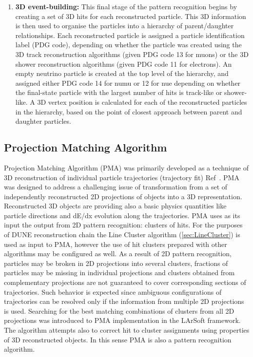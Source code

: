 \begin{enumerate}
\item{\bf 3D event-building:} This final stage of the pattern recognition begins by creating a set of 3D hits for each reconstructed particle. This 3D information is then used to organise the particles into a hierarchy of parent/daughter relationships. Each reconstructed particle is assigned a particle identification label (PDG code), depending on whether the particle was created using the 3D track reconstruction algorithms (given PDG code 13 for muons) or the 3D shower reconstruction algorithms (given PDG code 11 for electrons). An empty neutrino particle is created at the top level of the hierarchy, and assigned either PDG code 14 for numu or 12 for nue depending on whether the final-state particle with the largest number of hits is track-like or shower-like. A 3D vertex position is calculated for each of the reconstructed particles in the hierarchy, based on the point of closest approach between parent and daughter particles.
\end{enumerate}

\subsection{Projection Matching Algorithm}\label{sec:PMA}
Projection Matching Algorithm (PMA) was primarily developed as a technique of 3D reconstruction of individual particle trajectories (trajectory fit) Ref~\cite{Antonello:2012hu}. PMA was designed to address a challenging issue of transformation from a set of independently reconstructed 2D projections of objects into a 3D representation. Reconstructed 3D objects are providing also a basic physics quantities like particle directions and dE/dx evolution along the trajectories. PMA uses as its input the output from 2D pattern recognition: clusters of hits. For the purposes of DUNE reconstruction chain the Line Cluster algorithm (\ref{sec:LineCluster}) is used as input to PMA, however the use of hit clusters prepared with other algorithms may be configured as well. As a result of 2D pattern recognition, particles may be broken in 2D projections into several clusters, fractions of particles may be missing in individual projections and clusters obtained from complementary projections are not guaranteed to cover corresponding sections of trajectories. Such behavior is expected since ambiguous configurations of trajectories can be resolved only if the information from multiple 2D projections is used. Searching for the best matching combinations of clusters from all 2D projections was introduced to PMA implementation in the LArSoft framework. The algorithm attempts also to correct hit to cluster assignments using properties of 3D reconstructed objects. In this sense PMA is also a pattern recognition algorithm.

